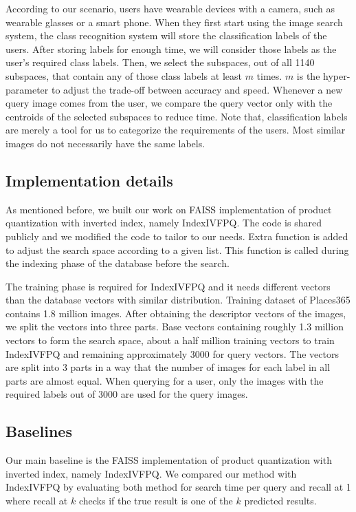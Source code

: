 According to our scenario, users have wearable devices with a camera, such as wearable glasses or a smart phone. 
When they first start using the image search system, the class recognition system will store the classification labels of the users. 
After storing labels for enough time, we will consider those labels as the user's required class labels.
Then, we select the subspaces, out of all 1140 subspaces, that contain any of those class labels at least $m$ times. 
$m$ is the hyper-parameter to adjust the trade-off between accuracy and speed.
Whenever a new query image comes from the user, we compare the query vector only with the centroids of the selected subspaces to reduce time.
Note that, classification labels are merely a tool for us to categorize the requirements of the users.
Most similar images do not necessarily have the same labels.


\subsection{Implementation details}

As mentioned before, we built our work on FAISS implementation\cite{faiss} of product quantization with inverted index, namely IndexIVFPQ. 
The code is shared publicly and we modified the code to tailor to our needs.
Extra function is added to adjust the search space according to a given list. 
This function is called during the indexing phase of the database before the search.

The training phase is required for IndexIVFPQ and it needs different vectors than the database vectors with similar distribution.
Training dataset of Places365 contains 1.8 million images. 
After obtaining the descriptor vectors of the images, we split the vectors into three parts.
Base vectors containing roughly 1.3 million vectors to form the search space, about a half million training vectors to train IndexIVFPQ and remaining approximately 3000 for query vectors.
The vectors are split into 3 parts in a way that the number of images for each label in all parts are almost equal.
When querying for a user, only the images with the required labels out of 3000 are used for the query images.

\subsection{Baselines}

Our main baseline is the FAISS implementation\cite{faiss} of product quantization with inverted index, namely IndexIVFPQ.
We compared our method with IndexIVFPQ by evaluating both method for search time per query and recall at 1 where recall at $k$ checks if the true result is one of the $k$ predicted results. 

